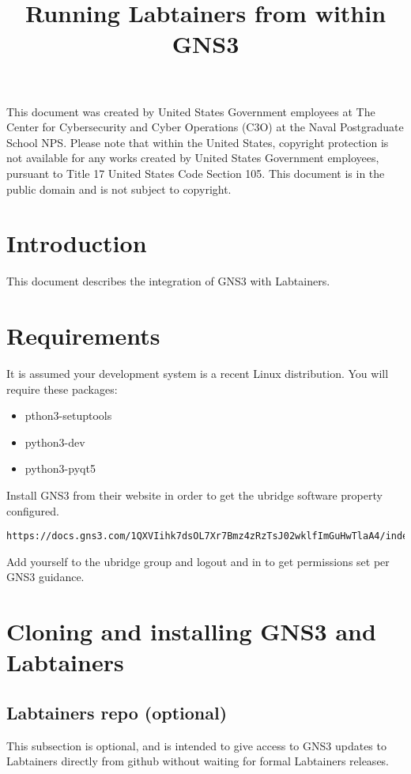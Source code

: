 \documentclass[12pt]{article}
\begin{document}
\begin{titlepage}
\title {Running Labtainers from within GNS3}
\maketitle

\vspace{2.0in}
This document was created by United States Government employees at 
The Center for Cybersecurity and Cyber Operations (C3O) at the Naval Postgraduate School NPS. 
Please note that within the United States, copyright protection is not available for any works created  
by United States Government employees, pursuant to Title 17 United States Code Section 105.   
This document is in the public domain and is not subject to copyright. 
\end{titlepage}
\tableofcontents
\newpage
\section {Introduction}
This document describes the integration of GNS3 with Labtainers.

\section {Requirements}
It is assumed your development system is a recent Linux distribution.  You will require these packages:
\begin{itemize}
	\item pthon3-setuptools
	\item python3-dev
	\item python3-pyqt5
\end{itemize}
\noindent Install GNS3 from their website in order to get the ubridge software property configured.
\begin{verbatim}
https://docs.gns3.com/1QXVIihk7dsOL7Xr7Bmz4zRzTsJ02wklfImGuHwTlaA4/index.html
\end{verbatim}
Add yourself to the ubridge group and logout and in to get permissions set per GNS3 guidance.

\section{Cloning and installing GNS3 and Labtainers}
\subsection{Labtainers repo (optional)}
This subsection is optional, and is intended to give access to GNS3 updates to Labtainers directly
from github without waiting for formal Labtainers releases.  
\end{document}

